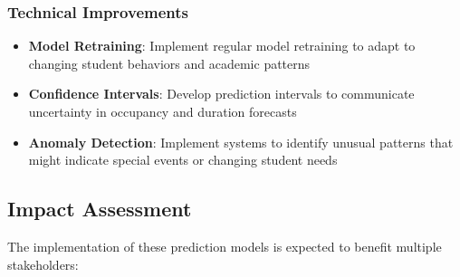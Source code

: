 \documentclass[12pt,letterpaper]{article}
\begin{document}
\subsubsection{Technical Improvements}

\begin{itemize}
    \item \textbf{Model Retraining}: Implement regular model retraining to adapt to changing student behaviors and academic patterns
    
    \item \textbf{Confidence Intervals}: Develop prediction intervals to communicate uncertainty in occupancy and duration forecasts
    
    \item \textbf{Anomaly Detection}: Implement systems to identify unusual patterns that might indicate special events or changing student needs
\end{itemize}

\subsection{Impact Assessment}

The implementation of these prediction models is expected to benefit multiple stakeholders:
\end{document}
